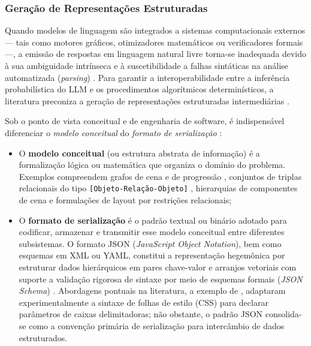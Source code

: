 \subsubsection{Geração de Representações Estruturadas}
\label{sec:representacoes_estruturadas}

Quando modelos de linguagem são integrados a sistemas computacionais externos --- tais como motores gráficos, otimizadores matemáticos ou verificadores formais ---, a emissão de respostas em linguagem natural livre torna-se inadequada devido à sua ambiguidade intrínseca e à suscetibilidade a falhas sintáticas na análise automatizada (\textit{parsing}) \cite{xu2025constraint, regmi2025system}. Para garantir a interoperabilidade entre a inferência probabilística do LLM e os procedimentos algorítmicos determinísticos, a literatura preconiza a geração de representações estruturadas intermediárias \cite{hu2024scenecraft, tang2025unrealllm, xu2025constraint, chen2025narrative, wang2026designerlyloop}.

Sob o ponto de vista conceitual e de engenharia de software, é indispensável diferenciar o \textit{modelo conceitual} do \textit{formato de serialização} \cite{xu2025constraint, xu2025databasedrivenframework3dlevel, chen2025narrative}:
\begin{itemize}
    \item O \textbf{modelo conceitual} (ou estrutura abstrata de informação) é a formalização lógica ou matemática que organiza o domínio do problema. Exemplos compreendem grafos de cena e de progressão \cite{xu2025databasedrivenframework3dlevel, wang2026designerlyloop}, conjuntos de triplas relacionais do tipo \texttt{[Objeto-Relação-Objeto]} \cite{chen2025narrative}, hierarquias de componentes de cena e formulações de layout por restrições relacionais;
    \item O \textbf{formato de serialização} é o padrão textual ou binário adotado para codificar, armazenar e transmitir esse modelo conceitual entre diferentes subsistemas. O formato JSON (\textit{JavaScript Object Notation}), bem como esquemas em XML ou YAML, constitui a representação hegemônica por estruturar dados hierárquicos em pares chave-valor e arranjos vetoriais com suporte a validação rigorosa de sintaxe por meio de esquemas formais (\textit{JSON Schema}) \cite{tang2025unrealllm, sun2024roomplanner, xu2025databasedrivenframework3dlevel}. Abordagens pontuais na literatura, a exemplo de \textcite{ocal2024sceneteller}, adaptaram experimentalmente a sintaxe de folhas de estilo (CSS) para declarar parâmetros de caixas delimitadoras; não obstante, o padrão JSON consolida-se como a convenção primária de serialização para intercâmbio de dados estruturados.
\end{itemize}

